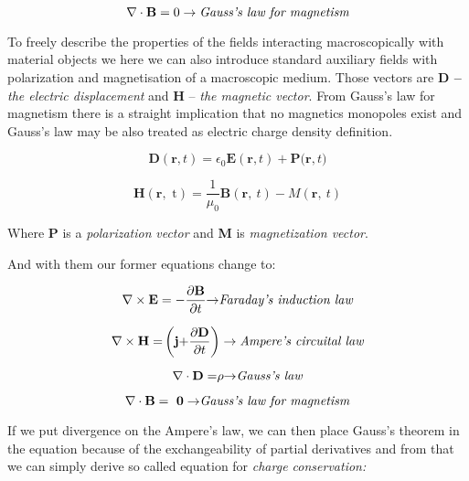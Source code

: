 \begin{equation}
\nabla \cdot \mathbf{B} =  0 \rightarrow \emph{Gauss's law for
magnetism}
\end{equation}

To freely describe the properties of the fields interacting
macroscopically with material objects we here we can also introduce
standard auxiliary fields with polarization and magnetisation of a
macroscopic medium. Those vectors are \textbf{D --} \emph{the electric
displacement} and \textbf{H} -- \emph{the magnetic vector}. From Gauss's
law for magnetism there is a straight implication that no magnetics
monopoles exist and Gauss's law may be also treated as electric charge
density definition.

\begin{equation}
\mathbf{D}\left( \mathbf{r,}t \right) = \epsilon_{0}\mathbf{E}\left( \mathbf{r,}t \right) + \mathbf{P(r,}t)
\end{equation}

\begin{equation}
\mathbf{H}\left( \mathbf{r,}\text{\ t} \right) = \frac{1}{\mu_{0}}\mathbf{B}\left( \mathbf{r,\ }t \right) - M(\mathbf{r,\ }t)
\end{equation}

\noindent Where \textbf{P} is a \emph{polarization} \emph{vector} and \textbf{M}
is \emph{magnetization vector}.

\noindent And with them our former equations change to:

\begin{equation}
\nabla \times \mathbf{E} = -\frac{\partial\mathbf{B}}{\partial t}\mathbf{\rightarrow}
\emph{Faraday's induction law}
\end{equation}

\begin{equation}
\nabla \times \mathbf{H =}\left( \mathbf{j +}\frac{\partial\mathbf{D}}{\partial t} \right) \rightarrow
\emph{Ampere's circuital law}
\end{equation}

\begin{equation}
\nabla \cdot \mathbf{D =}\rho\mathbf{\rightarrow} \emph{Gauss's
law}
\end{equation}

\begin{equation}
\nabla \cdot \mathbf{B = \ 0 \rightarrow} \emph{Gauss's law for
magnetism}
\end{equation}

If we put divergence on the Ampere's law, we can then place Gauss's
theorem in the equation because of the exchangeability of partial
derivatives and from that we can simply derive so called equation for
\emph{charge conservation:}

